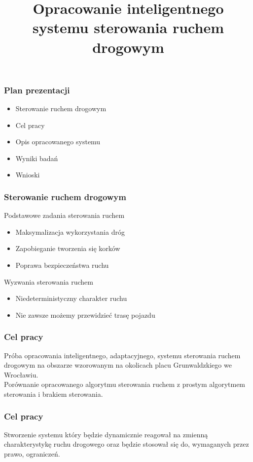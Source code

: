 \documentclass[17pt]{beamer}
\author{}
\title{Opracowanie inteligentnego systemu sterowania ruchem drogowym}
\subtitle{}
\date{}
\institute{autor: inż. Przemysław Rokosz\\\vspace{\baselineskip}promotor: dr inż. Grzegorz Filcek}
\begin{document}
\begin{frame}[plain,t]
 \maketitle
\end{frame}

\begin{frame}[shrink=5]
 \frametitle{\vspace{22px}Plan prezentacji}
 \begin{itemize}
  \item{Sterowanie ruchem drogowym}
  \item{Cel pracy}
  \item{Opis opracowanego systemu}
  \item{Wyniki badań}
  \item{Wnioski}
 \end{itemize}
\end{frame}

\begin{frame}[shrink=5]
 \frametitle{\vspace{22px}Sterowanie ruchem drogowym}
 Podstawowe zadania sterowania ruchem
 \begin{itemize}
  \item{Maksymalizacja wykorzystania dróg}
  \item{Zapobieganie tworzenia się korków}
  \item{Poprawa bezpieczeństwa ruchu}
 \end{itemize}
 Wyzwania sterowania ruchem
 \begin{itemize}
  \item{Niedeterministyczny charakter ruchu}
  \item{Nie zawsze możemy przewidzieć trasę pojazdu}
 \end{itemize}
\end{frame}

\begin{frame}[shrink=5]
 \frametitle{\vspace{22px}Cel pracy}
 Próba opracowania inteligentnego, adaptacyjnego, systemu sterowania ruchem drogowym na obszarze wzorowanym na okolicach placu Grunwaldzkiego we Wrocławiu.\\
 Porównanie opracowanego algorytmu sterowania ruchem z prostym algorytmem sterowania i brakiem sterowania.\\
\end{frame}

\begin{frame}[shrink=5]
 \frametitle{\vspace{22px}Cel pracy}
Stworzenie systemu który będzie dynamicznie reagował na zmienną charakterystykę ruchu drogowego oraz będzie stosował się do, wymaganych przez prawo, ograniczeń.
\end{frame}
\end{document}
